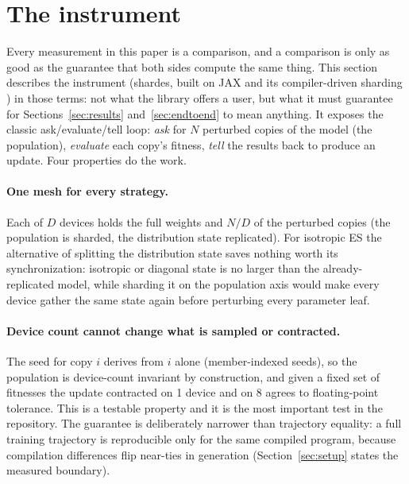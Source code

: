 \section{The instrument}
\label{sec:design}

Every measurement in this paper is a comparison, and a comparison is only as
good as the guarantee that both sides compute the same thing. This section
describes the instrument (shardes, built on JAX and its
compiler-driven sharding \citealp{jax2018,gspmd2021}) in those terms: not what the library
offers a user, but what it must guarantee for Sections~\ref{sec:results}
and~\ref{sec:endtoend} to mean anything. It exposes the classic
ask/evaluate/tell loop: \emph{ask} for $N$ perturbed copies of the model (the
population), \emph{evaluate} each copy's fitness, \emph{tell} the results
back to produce an update. Four properties do the work.

\paragraph{One mesh for every strategy.} Each of
$D$ devices holds the full weights and $N/D$ of the perturbed copies (the
population is sharded, the distribution state replicated). For isotropic ES
the alternative of splitting the distribution state saves nothing worth its
synchronization: isotropic or diagonal state is no larger than the
already-replicated model, while sharding it on the population axis would make
every device gather the same state again before perturbing every parameter
leaf.

\paragraph{Device count cannot change what is sampled or contracted.}
The seed for copy $i$ derives from $i$ alone (member-indexed seeds), so the
population is device-count invariant by construction, and given a fixed set
of fitnesses the update contracted on 1 device and on 8 agrees to
floating-point tolerance. This is a testable property and it is the most
important test in the repository. The guarantee is deliberately narrower
than trajectory equality: a full training trajectory is reproducible only
for the same compiled program, because compilation differences flip
near-ties in generation (Section~\ref{sec:setup} states the measured
boundary).

